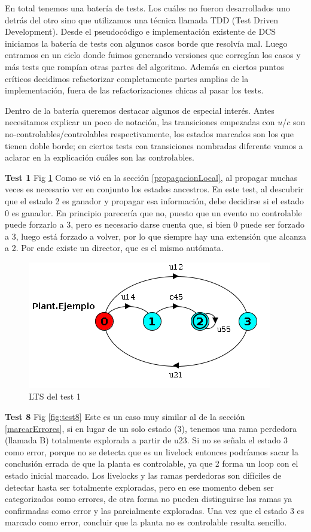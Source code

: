En total tenemos una batería de \totalTests tests. Los cuáles no fueron desarrollados uno detrás del otro sino que utilizamos una técnica llamada TDD (Test Driven Development). Desde el pseudocódigo e implementación existente de DCS iniciamos la batería de tests con algunos casos borde que resolvía mal.
Luego entramos en un ciclo donde fuimos generando versiones que corregían los casos y más tests que rompían otras partes del algoritmo. Además en ciertos puntos críticos decidimos refactorizar completamente partes amplias de la implementación, fuera de las refactorizaciones chicas al pasar los tests.

Dentro de la batería queremos destacar algunos de especial interés. Antes necesitamos explicar un poco de notación, las transiciones empezadas con $u$/$c$ son no-controlables/controlables respectivamente, los estados marcados son los que tienen doble borde; en ciertos tests con transiciones nombradas diferente vamos a aclarar en la explicación cuáles son las controlables.
\bigskip

\textbf{Test 1} Fig \ref{fig:test1}
Como se vió en la sección \ref{propagacionLocal}, al propagar muchas veces es necesario ver en conjunto los estados ancestros. En este test, al descubrir que el estado 2 es ganador y propagar esa información, debe decidirse si el estado 0 es ganador. En principio parecería que no, puesto que un evento no controlable puede forzarlo a 3, pero es necesario darse cuenta que, si bien 0 puede ser forzado a 3, luego está forzado a volver, por lo que siempre hay una extensión que alcanza a 2. Por ende existe un director, que es el mismo autómata.
\begin{figure}[h]
 \centering
 \includegraphics[scale=0.7]{figures/tests/test1.png}
 \caption{LTS del test 1}
 \label{fig:test1}
\end{figure}

\FloatBarrier
\textbf{Test 8} Fig \ref{fig:test8} 
Este es un caso muy similar al de la sección \ref{marcarErrores}, si en lugar de un solo estado (3), tenemos una rama perdedora (llamada B) totalmente explorada a partir de u23. Si no se señala el estado 3 como error, porque no se detecta que es un livelock entonces podríamos sacar la conclusión errada de que la planta es controlable, ya que 2 forma un loop con el estado inicial marcado. Los livelocks y las ramas perdedoras son difíciles de detectar hasta ser totalmente exploradas, pero en ese momento deben ser categorizados como errores, de otra forma no pueden distinguirse las ramas ya confirmadas como error y las parcialmente exploradas. Una vez que el estado 3 es marcado como error, concluir que la planta no es controlable resulta sencillo.

